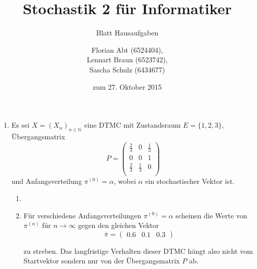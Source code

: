 \documentclass[a4paper]{scrartcl}
\title{Stochastik 2 für Informatiker}
\subtitle{Blatt {\blattnr} Hausaufgaben}
\author{
    Florian Abt (6524404), \\
    Lennart Braun (6523742), \\
    Sascha Schulz (6434677)
}
\date{zum 27. Oktober 2015}
\newcommand{\N}{\mathbb{N}}
\def \blattnr {2}
\begin{document}
\maketitle

\begin{enumerate}[label=\bfseries \blattnr.\arabic*]
    \item
        Es sei $X = (X_n)_{n \in \N}$ eine DTMC mit Zustandsraum $E =
        \{1,2,3\}$, Übergangsmatrix
        \begin{equation*}
            P =
            \begin{pmatrix}
                \frac{2}{3} & 0 & \frac{1}{3} \\
                0 & 0 & 1 \\
                \frac{2}{3} & \frac{1}{3} & 0 \\
            \end{pmatrix}
        \end{equation*}
        und Anfangsverteilung $\pi^{(0)} = \alpha$, wobei $\alpha$ ein
        stochastischer Vektor ist.
        \begin{enumerate}[label=\alph*)]
            \item
                

            \item
                Für verschiedene Anfangsverteilungen $\pi^{(0)} = \alpha$
                scheinen die Werte von $\pi^{(n)}$ für $n \to \infty$ gegen den
                gleichen Vektor
                \begin{equation*}
                    \overline{\pi} =
                    \begin{pmatrix}
                        \num{0,6} & \num{0,1} & \num{0,3}
                    \end{pmatrix}
                \end{equation*}
                                                                    
                zu streben. Das langfristige Verhalten dieser DTMC hängt also
                nicht vom Startvektor sondern nur von der Übergangsmatrix $P$
                ab.

        \end{enumerate}


\end{enumerate}
\end{document}
